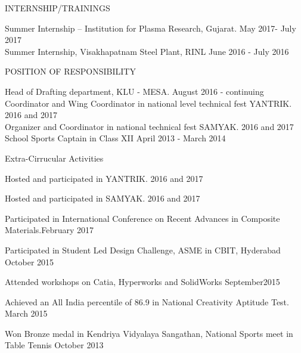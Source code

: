 \documentclass{resume} %
\begin{document}
\begin{rSection}{INTERNSHIP/TRAININGS} 

{Summer Internship – Institution for Plasma Research, Gujarat.} \hfill May 2017- July 2017 \\ 
{Summer Internship, Visakhapatnam Steel Plant, RINL} \hfill June 2016 - July 2016\\

\end{rSection} 

\begin{rSection}{POSITION OF RESPONSIBILITY}

{ Head of Drafting department, KLU - MESA.} \hfill August 2016 - continuing \\
{ Coordinator and Wing Coordinator in national level technical fest YANTRIK.} \hfill 2016 and 2017 \\ 
{ Organizer and Coordinator in national technical fest SAMYAK.} \hfill 2016 and 2017\\ 
{ School Sports Captain in Class XII} \hfill April 2013 - March 2014 \\


\end{rSection}


\begin{rSection}{Extra-Cirrucular Activities} \itemsep -1pt {}   
\item Hosted and participated in YANTRIK. \hfill 2016 and 2017
\item Hosted and participated in SAMYAK. \hfill 2016 and 2017
\item Participated in International Conference on Recent Advances in Composite Materials.\hfill February 2017
\item Participated in Student Led Design Challenge, ASME in CBIT, Hyderabad \hfill October 2015 
\item Attended workshops on Catia, Hyperworks and SolidWorks \hfill September2015
\item Achieved an All India percentile of 86.9 in National Creativity Aptitude Test. \hfill March 2015
\item Won Bronze medal in Kendriya Vidyalaya Sangathan, National Sports meet in Table Tennis  \hfill October 2013 
 

\end{rSection}
\end{document}
